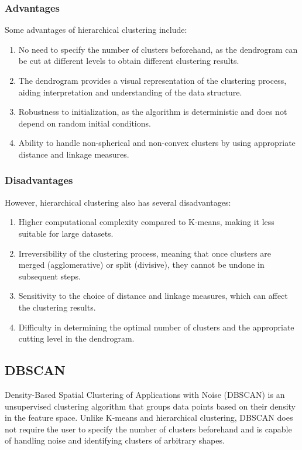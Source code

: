 \documentclass[12pt]{article}
\begin{document}
\subsubsection{Advantages}
Some advantages of hierarchical clustering include:
\begin{enumerate}
\item No need to specify the number of clusters beforehand, as the dendrogram can be cut at different levels to obtain different clustering results.
\item The dendrogram provides a visual representation of the clustering process, aiding interpretation and understanding of the data structure.
\item Robustness to initialization, as the algorithm is deterministic and does not depend on random initial conditions.
\item Ability to handle non-spherical and non-convex clusters by using appropriate distance and linkage measures.
\end{enumerate}

\subsubsection{Disadvantages}
However, hierarchical clustering also has several disadvantages:
\begin{enumerate}
\item Higher computational complexity compared to K-means, making it less suitable for large datasets.
\item Irreversibility of the clustering process, meaning that once clusters are merged (agglomerative) or split (divisive), they cannot be undone in subsequent steps.
\item Sensitivity to the choice of distance and linkage measures, which can affect the clustering results.
\item Difficulty in determining the optimal number of clusters and the appropriate cutting level in the dendrogram.
\end{enumerate}

\subsection{DBSCAN}
Density-Based Spatial Clustering of Applications with Noise (DBSCAN) is an unsupervised clustering algorithm that groups data points based on their density in the feature space. Unlike K-means and hierarchical clustering, DBSCAN does not require the user to specify the number of clusters beforehand and is capable of handling noise and identifying clusters of arbitrary shapes.
\end{document}
